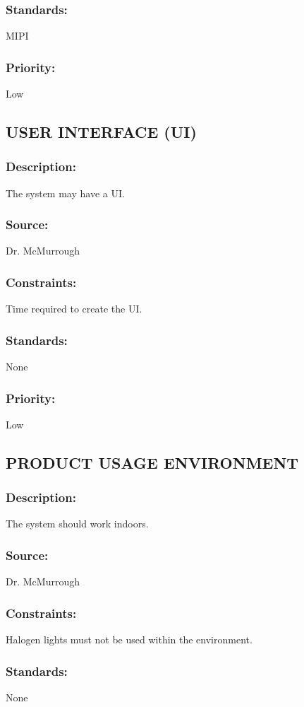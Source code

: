 \subsubsection{Standards:} 
	{MIPI}
\subsubsection{Priority:} 
	{Low}

\subsection{\text USER INTERFACE (UI)}
\subsubsection{Description:} 
	{The system may have a UI.} 
\subsubsection{Source:} 
	{Dr. McMurrough}
\subsubsection{Constraints:} 
	{Time required to create the UI.}
\subsubsection{Standards:} 
	{None}
\subsubsection{Priority:} 
	{Low}

\subsection{\text PRODUCT USAGE ENVIRONMENT}
\subsubsection{Description:} 
	{The system should work indoors.}
\subsubsection{Source:} 
	{Dr. McMurrough}
\subsubsection{Constraints:} 
	{Halogen lights must not be used within the environment.}
\subsubsection{Standards:} 
	{None}
